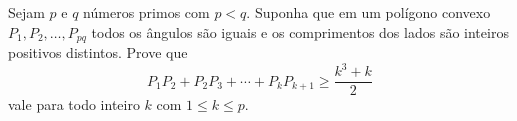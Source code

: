 Sejam \(p\) e \(q\) números primos com \(p<q\). Suponha que em um polígono convexo \(P_1,P_2,\ldots,P_{pq}\) todos os ângulos são iguais e os comprimentos dos lados são inteiros positivos distintos. Prove que
\[
P_1P_2+P_2P_3+\cdots +P_kP_{k+1}\geqslant \frac{k^3+k}{2}
\]
vale para todo inteiro \(k\) com \(1\leqslant k\leqslant p\).
